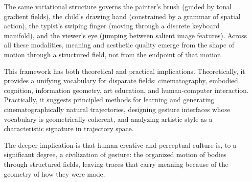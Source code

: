 \documentclass[12pt,a4paper]{article}
\theoremstyle{plain}
\theoremstyle{definition}
\begin{document}
The same variational structure governs the painter's brush (guided by tonal
gradient fields), the child's drawing hand (constrained by a grammar of spatial
action), the typist's swiping finger (moving through a discrete keyboard
manifold), and the viewer's eye (jumping between salient image features).
Across all these modalities, meaning and aesthetic quality emerge from the shape
of motion through a structured field, not from the endpoint of that motion.

This framework has both theoretical and practical implications. Theoretically,
it provides a unifying vocabulary for disparate fields: cinematography, embodied
cognition, information geometry, art education, and human-computer interaction.
Practically, it suggests principled methods for learning and generating
cinematographically natural trajectories, designing gesture interfaces whose
vocabulary is geometrically coherent, and analyzing artistic style as a
characteristic signature in trajectory space.

The deeper implication is that human creative and perceptual culture is, to a
significant degree, a civilization of gesture: the organized motion of bodies
through structured fields, leaving traces that carry meaning because of the
geometry of how they were made.
\end{document}
